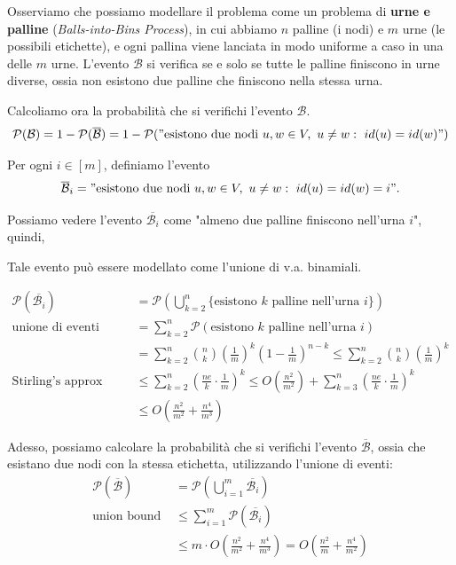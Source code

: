 Osserviamo che possiamo modellare il problema come un problema di \textbf{urne e palline} (\textit{Balls-into-Bins Process}), in cui abbiamo $n$ palline (i nodi) e $m$ urne (le possibili etichette), e ogni pallina viene lanciata in modo uniforme a caso in una delle $m$ urne. L'evento $\mathcal{B}$ si verifica se e solo se tutte le palline finiscono in urne diverse, ossia non esistono due palline che finiscono nella stessa urna.

Calcoliamo ora la probabilità che si verifichi l'evento $\mathcal{B}$. 
\[
    \mathcal{P}(\mathcal{B}) = 1 - \mathcal{P}(\overline{\mathcal{B}}) = 1 - \mathcal{P}("\text{esistono due nodi } u, w \in V,\ u \neq w:\ id(u) = id(w)")
\]

Per ogni $i \in [m]$, definiamo l'evento 
\[
    \overline{\mathcal{B}}_{i} = "\text{esistono due nodi } u, w \in V,\ u \neq w:\ id(u) = id(w) = i".
\]

Possiamo vedere l'evento $\overline{\mathcal{B}_i}$ come "almeno due palline finiscono nell'urna $i$", quindi,

Tale evento può essere modellato come l'unione di v.a. binamiali.

\begin{align*}
    \mathcal{P}(\overline{\mathcal{B}_i}) 
    &= \mathcal{P} \left( \bigcup_{k=2}^{n} \{ \text{esistono } k \text{ palline nell'urna } i \} \right) \\
    \text{unione di eventi disgiunti } &= \sum_{k=2}^{n} \mathcal{P} (\text{esistono } k \text{ palline nell'urna } i) \\
    &= \sum_{k=2}^{n} \binom{n}{k} \left( \frac{1}{m} \right)^k \left( 1 - \frac{1}{m} \right)^{n-k} \leq \sum_{k=2}^{n} \binom{n}{k} \left( \frac{1}{m} \right)^k \\
    \text{Stirling's approx } &\leq \sum_{k=2}^{n} \left( \frac{ne}{k} \cdot \frac{1}{m}\right)^k \leq O\left(\frac{n^2}{m^2}\right) + \sum_{k=3}^{n} \left( \frac{ne}{k} \cdot \frac{1}{m}\right)^k \\
    &\leq O\left(\frac{n^2}{m^2} + \frac{n^4}{m^3}\right)
\end{align*}

Adesso, possiamo calcolare la probabilità che si verifichi l'evento $\overline{\mathcal{B}}$, ossia che esistano due nodi con la stessa etichetta, utilizzando l'unione di eventi:
\begin{align*}
    \mathcal{P}(\overline{\mathcal{B}})
    &= \mathcal{P} \left( \bigcup_{i=1}^{m} \overline{\mathcal{B}_i} \right) \\
    \text{union bound } &\leq \sum_{i=1}^{m} \mathcal{P}(\overline{\mathcal{B}_i}) \\
    &\leq m \cdot O\left(\frac{n^2}{m^2} + \frac{n^4}{m^3}\right) = O\left(\frac{n^2}{m} + \frac{n^4}{m^2}\right)
\end{align*}

